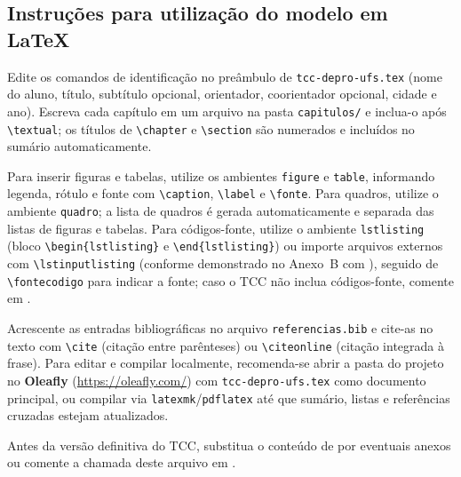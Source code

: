 \begin{anexosenv}
  \chapter{Instruções para utilização do modelo em LaTeX}

  Edite os comandos de identificação no preâmbulo de \texttt{tcc-depro-ufs.tex} (nome do aluno, título, subtítulo opcional, orientador, coorientador opcional, cidade e ano). Escreva cada capítulo em um arquivo na pasta \texttt{capitulos/} e inclua-o após \texttt{\textbackslash textual}; os títulos de \texttt{\textbackslash chapter} e \texttt{\textbackslash section} são numerados e incluídos no sumário automaticamente.

  Para inserir figuras e tabelas, utilize os ambientes \texttt{figure} e \texttt{table}, informando legenda, rótulo e fonte com \texttt{\textbackslash caption}, \texttt{\textbackslash label} e \texttt{\textbackslash fonte}. Para quadros, utilize o ambiente \texttt{quadro}; a lista de quadros é gerada automaticamente e separada das listas de figuras e tabelas. Para códigos-fonte, utilize o ambiente \texttt{lstlisting} (bloco \texttt{\textbackslash begin\{lstlisting\}} e \texttt{\textbackslash end\{lstlisting\}}) ou importe arquivos externos com \texttt{\textbackslash lstinputlisting} (conforme demonstrado no Anexo~B com ), seguido de \texttt{\textbackslash fontecodigo} para indicar a fonte; caso o TCC não inclua códigos-fonte, comente  em .

  Acrescente as entradas bibliográficas no arquivo \texttt{referencias.bib} e cite-as no texto com \texttt{\textbackslash cite} (citação entre parênteses) ou \texttt{\textbackslash citeonline} (citação integrada à frase). Para editar e compilar localmente, recomenda-se abrir a pasta do projeto no \textbf{Oleafly} (\url{https://oleafly.com/}) com \texttt{tcc-depro-ufs.tex} como documento principal, ou compilar via \texttt{latexmk}/\texttt{pdflatex} até que sumário, listas e referências cruzadas estejam atualizados.

  Antes da versão definitiva do TCC, substitua o conteúdo de  por eventuais anexos ou comente a chamada deste arquivo em .


\end{anexosenv}
